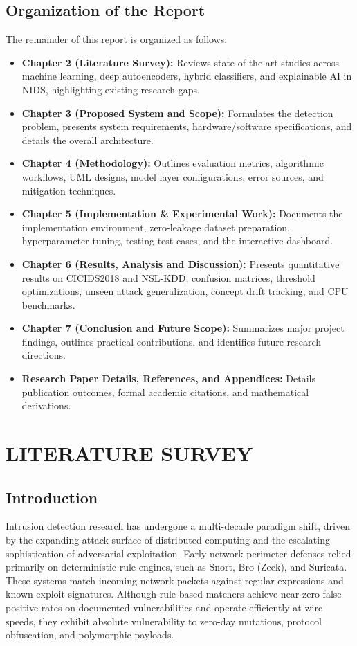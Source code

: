 \documentclass[12pt,a4paper]{report}
\begin{document}
\section{Organization of the Report}
The remainder of this report is organized as follows:
\begin{itemize}
    \item \textbf{Chapter 2 (Literature Survey):} Reviews state-of-the-art studies across machine learning, deep autoencoders, hybrid classifiers, and explainable AI in NIDS, highlighting existing research gaps.
    \item \textbf{Chapter 3 (Proposed System and Scope):} Formulates the detection problem, presents system requirements, hardware/software specifications, and details the overall architecture.
    \item \textbf{Chapter 4 (Methodology):} Outlines evaluation metrics, algorithmic workflows, UML designs, model layer configurations, error sources, and mitigation techniques.
    \item \textbf{Chapter 5 (Implementation \& Experimental Work):} Documents the implementation environment, zero-leakage dataset preparation, hyperparameter tuning, testing test cases, and the interactive dashboard.
    \item \textbf{Chapter 6 (Results, Analysis and Discussion):} Presents quantitative results on CICIDS2018 and NSL-KDD, confusion matrices, threshold optimizations, unseen attack generalization, concept drift tracking, and CPU benchmarks.
    \item \textbf{Chapter 7 (Conclusion and Future Scope):} Summarizes major project findings, outlines practical contributions, and identifies future research directions.
    \item \textbf{Research Paper Details, References, and Appendices:} Details publication outcomes, formal academic citations, and mathematical derivations.
\end{itemize}

\clearpage
\chapter{LITERATURE SURVEY}\label{ch:lit_survey}

\section{Introduction}
Intrusion detection research has undergone a multi-decade paradigm shift, driven by the expanding attack surface of distributed computing and the escalating sophistication of adversarial exploitation. Early network perimeter defenses relied primarily on deterministic rule engines, such as Snort, Bro (Zeek), and Suricata. These systems match incoming network packets against regular expressions and known exploit signatures. Although rule-based matchers achieve near-zero false positive rates on documented vulnerabilities and operate efficiently at wire speeds, they exhibit absolute vulnerability to zero-day mutations, protocol obfuscation, and polymorphic payloads.
\end{document}
